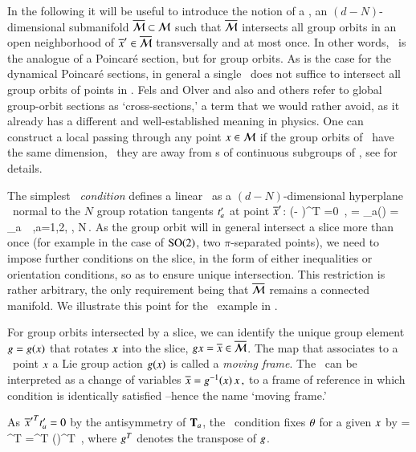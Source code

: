 \documentclass[preprint,number,sort&compress]{elsarticle}
\begin{document}
In the following it will be useful to introduce the notion of
a \emph{\slice}, an $(d-N)$-dimensional submanifold
$\overline{\cal M}\subset{\cal M}$ such that $\overline{\cal M}$ intersects all group
orbits in an open neighborhood of ${\overline{x}'} \in \overline{\cal M}$
transversally and at most once. In other words, \slice\ is
the analogue of a Poincar\'e section, but for group orbits.
As is the case for the dynamical Poincar\'e sections, in
general a single \slice\ does not suffice to intersect all
group orbits of points in \pS. Fels and Olver
and also 
and others refer to global group-orbit sections as
`cross-sections,' a term that we would rather avoid, as it
already has a different and well-established meaning in
physics.
One can construct a local {\slice}
passing through any point $x\in {\cal M}$ if the group orbits of
\Group\ have the same dimension, \ie\ {they are} away from {\fixedsp s}
of continuous subgroups of \Group, see 
for details.

The simplest {\em \slice\ condition} defines a linear \slice\ as a
$(d\!-\!N)$-dim\-ens\-ion\-al hyperplane \pSRed\ normal to
the $N$ group rotation tangents $t'_{a}$ at point ${\overline{x}'}$:
\beq
(\sspRed - \slicep )^T  =0
    \,,\qquad
{} = \groupTan_a(\slicep) = \Lg_a \, \slicep
\,,\qquad a=1,2, \cdots, N\,.
As the group orbit will in general intersect a slice
more than once (for example in the case of $\textrm{SO}(2)$, two
$\pi$-separated points), we need to impose further conditions on
the slice, in the form of either inequalities or
orientation conditions, so as to ensure unique intersection.
This restriction is rather arbitrary, the only requirement
being that $\overline{\cal M}$ remains a connected manifold. We
illustrate this point for the \cLf\ example in
.

For group orbits intersected by a slice, we can identify the
unique group element $g=g(x)$ that rotates
$x$ into the slice, $gx = \overline{x} \in \overline{\cal M}$. The
map that associates to a \statesp\ point $x$ a Lie group
action $g(x)$ is called a \emph{moving frame}.
The \mframes\ can be interpreted as a change of variables
$
\overline{x} = g^{-1}(x) \, x
\,,
$%
to a frame of reference in which condition 
is identically satisfied --hence the name `moving frame.'



As ${\overline{x}'}^T t'_{a} =0$ by the antisymmetry of
$\mathbf{T}_a$, the \slice\ condition  fixes
${\bf \theta}$ for a given $x$ by
 = \sspRed^T  
	=\ssp^T  \LieEl(\gSpace)^T 
\,,
where $g^T$ denotes the transpose of $g$.
\end{document}
